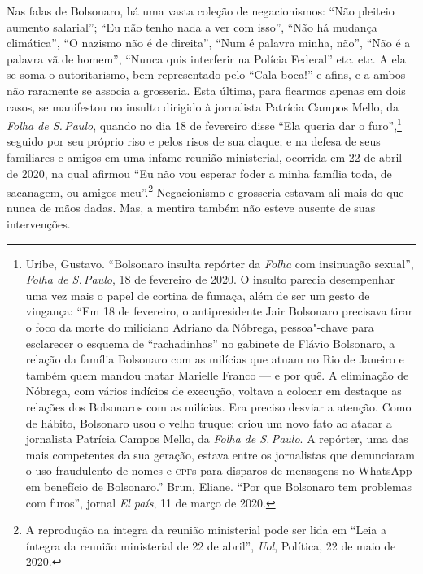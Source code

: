 Nas falas de Bolsonaro, há uma vasta coleção de negacionismos: ``Não
pleiteio aumento salarial''; ``Eu não tenho nada a ver com isso'', ``Não
há mudança climática'', ``O nazismo não é de direita'', ``Num é palavra
minha, não'', ``Não é a palavra vã de homem'', ``Nunca quis interferir
na Polícia Federal'' etc. etc. A ela se soma o autoritarismo, bem
representado pelo ``Cala boca!'' e afins, e a ambos não raramente se
associa a grosseria. Esta última, para ficarmos apenas em dois casos, se
manifestou no insulto dirigido à jornalista Patrícia Campos Mello, da
\textit{Folha de S.\,Paulo}, quando no dia 18 de fevereiro disse ``Ela queria dar
o furo'',\footnote{Uribe, Gustavo. ``Bolsonaro insulta repórter da \textit{Folha}
  com insinuação sexual'', \textit{Folha de S.\,Paulo}, 18 de fevereiro de 2020.
  O insulto parecia desempenhar uma vez mais o papel de cortina de
  fumaça, além de ser um gesto de vingança: ``Em 18 de fevereiro, o
  antipresidente Jair Bolsonaro precisava tirar o foco da morte do
  miliciano Adriano da Nóbrega, pessoa"-chave para esclarecer o esquema
  de ``rachadinhas'' no gabinete de Flávio Bolsonaro, a relação da
  família Bolsonaro com as milícias que atuam no Rio de Janeiro e também
  quem mandou matar Marielle Franco --- e por quê. A eliminação de
  Nóbrega, com vários indícios de execução, voltava a colocar em
  destaque as relações dos Bolsonaros com as milícias. Era preciso
  desviar a atenção. Como de hábito, Bolsonaro usou o velho truque:
  criou um novo fato ao atacar a jornalista Patrícia Campos Mello, da
  \textit{Folha de S.\,Paulo}. A repórter, uma das mais competentes da sua
  geração, estava entre os jornalistas que denunciaram o uso fraudulento
  de nomes e \textsc{cpf}s para disparos de mensagens no WhatsApp em benefício de
  Bolsonaro.'' Brun, Eliane. ``Por que Bolsonaro tem problemas com furos'',
  jornal \emph{El país}, 11 de março de 2020.}
seguido por seu próprio riso e pelos risos de sua claque; e na defesa de
seus familiares e amigos em uma infame reunião ministerial, ocorrida em
22 de abril de 2020, na qual afirmou ``Eu não vou esperar foder a minha
família toda, de sacanagem, ou amigos meu''.\footnote{A reprodução na
  íntegra da reunião ministerial pode ser lida em ``Leia a íntegra da reunião ministerial de 22 de abril'', \textit{Uol}, Política, 22 de maio de 2020.}
Negacionismo e grosseria estavam ali mais do que nunca de mãos dadas.
Mas, a mentira também não esteve ausente de suas intervenções.

